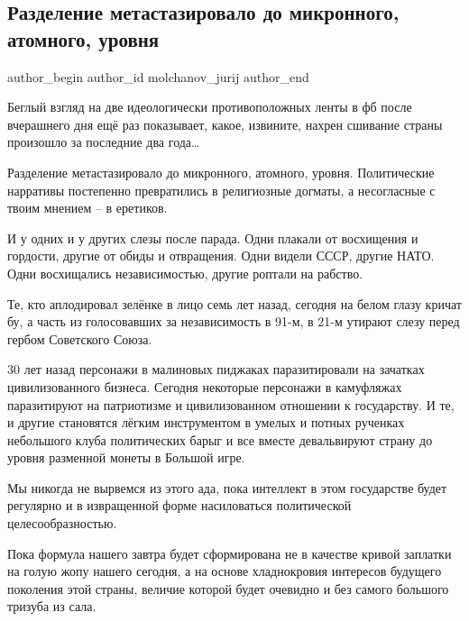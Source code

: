  
 
 
 
 
 
\subsection{Разделение метастазировало до микронного, атомного, уровня}
\label{sec:25_08_2021.fb.molchanov_jurij.1.razdelenie_strana}
 
\ifcmt
 author_begin
   author_id molchanov_jurij
 author_end
\fi

Беглый взгляд на две идеологически противоположных ленты в фб после вчерашнего
дня ещё раз показывает, какое, извините, нахрен сшивание страны произошло за
последние два года…

Разделение метастазировало до микронного, атомного, уровня. Политические
нарративы постепенно превратились в религиозные догматы, а несогласные с твоим
мнением – в еретиков.

И у одних и у других слезы после парада. Одни плакали от восхищения и гордости,
другие от обиды и отвращения. Одни видели СССР, другие НАТО. Одни восхищались
независимостью, другие роптали на рабство.

Те, кто аплодировал зелёнке в лицо семь лет назад, сегодня на белом глазу
кричат бу, а часть из голосовавших за независимость в 91-м, в 21-м утирают
слезу перед гербом Советского Союза.

30 лет назад персонажи в малиновых пиджаках паразитировали на зачатках
цивилизованного бизнеса. Сегодня некоторые персонажи в камуфляжах паразитируют
на патриотизме и цивилизованном отношении к государству. И те, и другие
становятся лёгким инструментом в умелых и потных рученках небольшого клуба
политических барыг и все вместе девальвируют страну до уровня разменной монеты
в Большой игре.

Мы никогда не вырвемся из этого ада, пока интеллект в этом государстве будет
регулярно и в извращенной форме насиловаться политической целесообразностью.

Пока формула нашего завтра будет сформирована не в качестве кривой заплатки на
голую жопу нашего сегодня, а на основе хладнокровия интересов будущего
поколения этой страны, величие которой будет очевидно и без самого большого
тризуба из сала.

